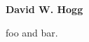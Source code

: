 \documentclass[12pt]{article}
\begin{document}
\sloppy\sloppypar\thispagestyle{empty}

\noindent
\textbf{David W. Hogg}
\smallskip

foo and bar.
\end{document}
